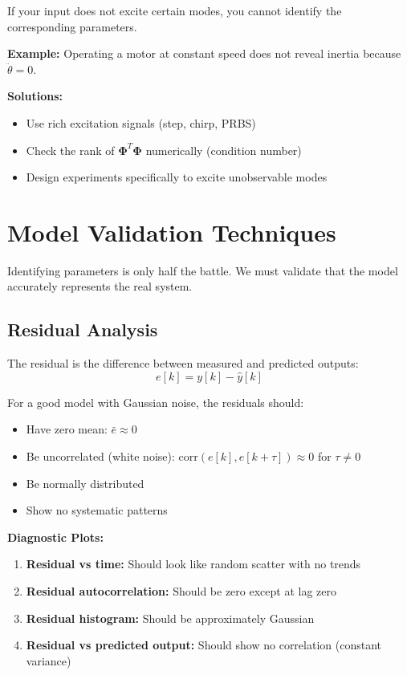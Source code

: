 If your input does not excite certain modes, you cannot identify the corresponding parameters.

\textbf{Example:} Operating a motor at constant speed does not reveal inertia because $\ddot{\theta} = 0$.

\textbf{Solutions:}
\begin{itemize}
    \item Use rich excitation signals (step, chirp, PRBS)
    \item Check the rank of $\mathbf{\Phi}^T\mathbf{\Phi}$ numerically (condition number)
    \item Design experiments specifically to excite unobservable modes
\end{itemize}

\section{Model Validation Techniques}

Identifying parameters is only half the battle. We must validate that the model accurately represents the real system.

\subsection{Residual Analysis}

The residual is the difference between measured and predicted outputs:
\begin{equation}
e[k] = y[k] - \hat{y}[k]
\end{equation}

For a good model with Gaussian noise, the residuals should:
\begin{itemize}
    \item Have zero mean: $\bar{e} \approx 0$
    \item Be uncorrelated (white noise): $\text{corr}(e[k], e[k+\tau]) \approx 0$ for $\tau \neq 0$
    \item Be normally distributed
    \item Show no systematic patterns
\end{itemize}

\textbf{Diagnostic Plots:}
\begin{enumerate}
    \item \textbf{Residual vs time:} Should look like random scatter with no trends
    \item \textbf{Residual autocorrelation:} Should be zero except at lag zero
    \item \textbf{Residual histogram:} Should be approximately Gaussian
    \item \textbf{Residual vs predicted output:} Should show no correlation (constant variance)
\end{enumerate}

